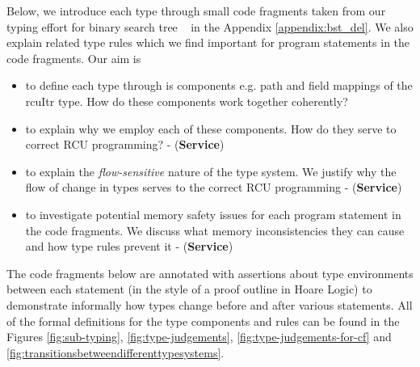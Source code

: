 Below, we introduce each type through small code fragments taken from our typing effort for binary search tree ~\cite{msdn_bst} in the Appendix \ref{appendix:bst_del}. We also explain related type rules which we find important for program statements in the code fragments. Our aim is
\begin{itemize}
\item to define each type through is components e.g. path and field mappings of the \textsf{rcuItr} type. How do these components work together coherently? 
\item to explain why we employ each of these components. How do they serve to correct \textsf{RCU} programming? - (\textbf{Service})
\item to explain the \textit{flow-sensitive} nature of the type system. We justify why the flow of change in types serves to the correct \textsf{RCU} programming - (\textbf{Service})
\item to investigate potential memory safety issues for each program statement in the code fragments. We discuss what memory inconsistencies they can cause and how type rules prevent it - (\textbf{Service})
\end{itemize}

The code fragments below are annotated with assertions about type environments between each statement (in the style of a proof outline in Hoare Logic) to demonstrate informally how types change before and after various statements. All of the formal definitions for the type components and rules can be found in the Figures \ref{fig:sub-typing}, \ref{fig:type-judgements}, \ref{fig:type-judgements-for-cf} and \ref{fig:transitionsbetweendifferenttypesystems}.

